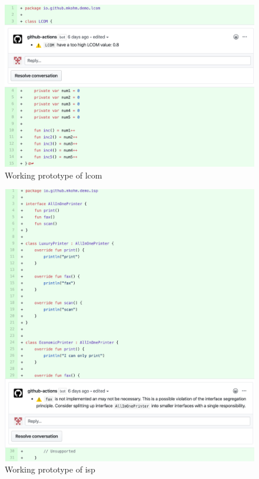 \begin{figure}[h!]
    \centering
    \includegraphics[width=\textwidth]{images/final_lcom.png}
    \caption{Working prototype of \gls{lcom}}
\end{figure}

\begin{figure}[h!]
    \centering
    \includegraphics[width=\textwidth]{images/final_isp.png}
    \caption{Working prototype of \gls{isp}}
\end{figure}


